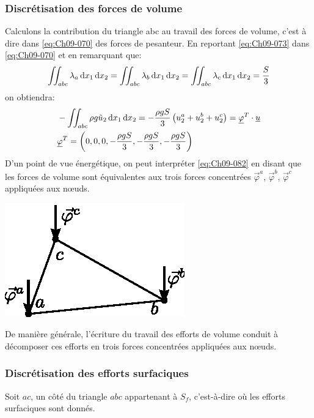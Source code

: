 \subsubsection{Discrétisation des forces de volume}
Calculons la contribution du triangle abc au travail des forces de volume, c'est à dire dans \eqref{eq:Ch09-070} des forces de pesanteur.
En reportant \eqref{eq:Ch09-073} dans \eqref{eq:Ch09-070} et en remarquant que:
\begin{equation}
    \iint_{abc} \lambda_a \mathop{\mathrm{{}d}}\mathopen{} x_1 \mathop{\mathrm{{}d}}\mathopen{} x_2 = \iint_{abc} \lambda_b \mathop{\mathrm{{}d}}\mathopen{} x_1 \mathop{\mathrm{{}d}}\mathopen{} x_2 = \iint_{abc} \lambda_c \mathop{\mathrm{{}d}}\mathopen{} x_1 \mathop{\mathrm{{}d}}\mathopen{} x_2 = \frac{S}{3}
    \label{eq:Ch09-081}
\end{equation}
on obtiendra:
\begin{align}
&    -\iint_{abc} \rho g \tilde{u}_2 \mathop{\mathrm{{}d}}\mathopen{} x_1 \mathop{\mathrm{{}d}}\mathopen{} x_2 = - \frac{\rho g S}{3} \left( u_2^a + u_2^b + u_2^c \right) = \underline{\varphi}^T \cdot \underline{u}
    \label{eq:Ch09-082}\\
&    \underline{\varphi}^T = \left( 0, 0, 0, -\frac{\rho g S}{3}, -\frac{\rho g S}{3}, -\frac{\rho g S}{3} \right)
    \label{eq:Ch09-083}
\end{align}
D'un point de vue énergétique, on peut interpréter \eqref{eq:Ch09-082} en disant que les forces de volume sont équivalentes aux trois forces concentrées $\vec{\varphi}^a$, $\vec{\varphi}^b$, $\vec{\varphi}^c$ appliquées aux nœuds. 
\begin{center}
    \includegraphics{../images/T1_Ch09-09}
\end{center}
De manière générale, l'écriture du travail des efforts de volume conduit à décomposer ces efforts en trois forces concentrées appliquées aux nœuds. 

\subsubsection{Discrétisation des efforts surfaciques}
Soit $ac$, un côté du triangle $abc$ appartenant à $S_f$, c'est-à-dire où les efforts surfaciques sont donnés.

